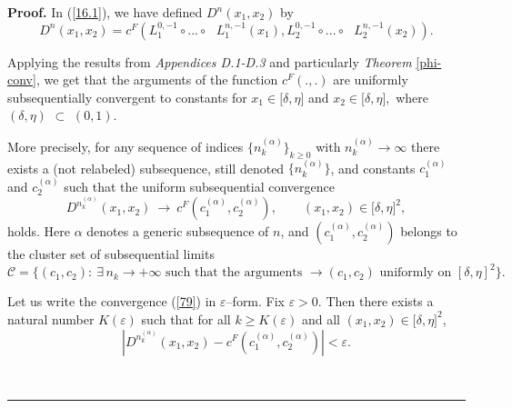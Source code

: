 \documentclass[onecolumn]{article}
\newenvironment{proof}[1][Proof]{\noindent\textbf{#1.} }{\ \rule{0.5em}{0.5em}}
\begin{document}
\begin{proof}
In (\ref{16.1}), we have defined $D^{n}(x_{1},x_{2})$ by%
\begin{equation}
D^{n}(x_{1},x_{2})=c^{F}(L_{1}^{0,-1}\circ ...\circ \text{ }%
L_{1}^{n,-1}(x_{1}),L_{2}^{0,-1}\circ ...\circ \text{ }L_{2}^{n,-1}(x_{2})).
\label{72}
\end{equation}

Applying the results from \textit{Appendices D.1-D.3 }and particularly 
\textit{Theorem }\ref{phi-conv}, we get that the arguments of the function $%
c^{F}(.,.)$ are uniformly subsequentially convergent to constants for $%
x_{1}\in \lbrack \delta ,\eta ]$ and $x_{2}\in \lbrack \delta ,\eta ],$
where $(\delta ,\eta )$ $\subset $ $(0,1)$.

More precisely, for any sequence of indices $\{n_{k}^{(\alpha )}\}_{k\geq 0}$
with $n_{k}^{(\alpha )}\rightarrow \infty $ there exists a (not relabeled)
subsequence, still denoted $\{n_{k}^{(\alpha )}\}$, and constants $%
c_{1}^{(\alpha )}$ and $c_{2}^{(\alpha )}$ such that the uniform
subsequential convergence 
\begin{equation}
D^{n_{k}^{(\alpha )}}(x_{1},x_{2})\ \longrightarrow \ c^{F}(c_{1}^{(\alpha
)},c_{2}^{(\alpha )}),\qquad (x_{1},x_{2})\in \lbrack \delta ,\eta ]^{2},
\label{79}
\end{equation}%
holds. Here $\alpha $ denotes a generic subsequence of $n$, and $%
(c_{1}^{(\alpha )},c_{2}^{(\alpha )})$ belongs to the cluster set of
subsequential limits 
\begin{equation}
\mathcal{C}=\{(c_{1},c_{2}):\ \exists \,n_{k}\rightarrow +\infty \text{ such
that the arguments }\rightarrow (c_{1},c_{2})\text{ uniformly on }[\delta
,\eta ]^{2}\}.  \label{79.1}
\end{equation}

Let us write the convergence (\ref{79}) in $\varepsilon $--form. Fix $%
\varepsilon >0$. Then there exists a natural number $K(\varepsilon )$ such
that for all $k\geq K(\varepsilon )$ and all $(x_{1},x_{2})\in \lbrack
\delta ,\eta ]^{2}$, 
\begin{equation}
\left\vert D^{n_{k}^{(\alpha )}}(x_{1},x_{2})-c^{F}(c_{1}^{(\alpha
)},c_{2}^{(\alpha )})\right\vert <\varepsilon .  \label{79.2}
\end{equation}


\end{proof}
\end{document}
